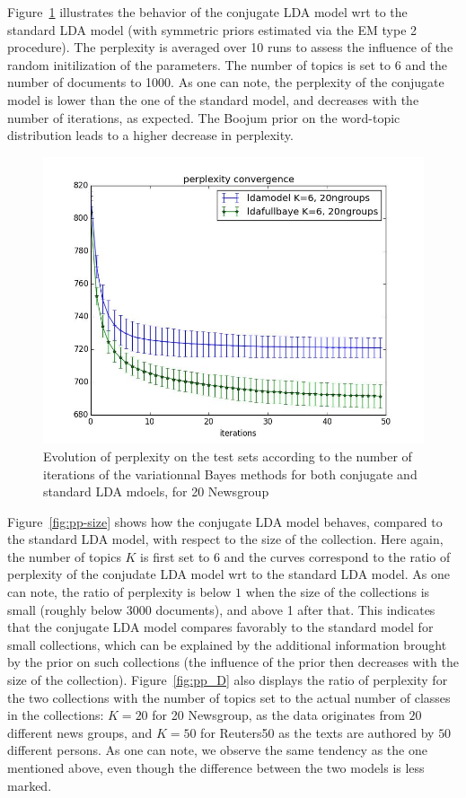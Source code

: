 Figure~\ref{fig:pp-exple} illustrates the behavior of the conjugate LDA model wrt to the standard LDA model (with symmetric priors estimated via the EM type 2 procedure). The perplexity is averaged over 10 runs to assess the influence of the random initilization of the parameters. The number of topics is set to 6 and the number of documents to 1000. As one can note, the perplexity of the conjugate model is lower than the one of the standard model, and decreases with the number of iterations, as expected. The Boojum prior on the word-topic distribution leads to a higher decrease in perplexity.

\begin{figure}[h]
\label{fig:pp-exple}
\includegraphics[scale=0.4]{results/pp_conv}
\caption{Evolution of perplexity on the test sets according to the number of iterations of the variationnal Bayes methods for both conjugate and standard LDA mdoels, for 20 Newsgroup}
\end{figure}


Figure~\ref{fig:pp-size} shows how the conjugate LDA model behaves, compared to the standard LDA model, with respect to the size of the collection. Here again, the number of topics $K$ is first set to $6$ and the curves correspond to the ratio of perplexity of the conjudate LDA model wrt to the standard LDA model. As one can note, the ratio of perplexity is below $1$ when the size of the collections is small (roughly below 3000 documents), and above 1 after that. This indicates that the conjugate LDA model compares favorably to the standard model for small collections, which can be explained by the additional information brought by the prior on such collections (the influence of the prior then decreases with the size of the collection). Figure~\ref{fig:pp_D} also displays the ratio of perplexity for the two collections with the number of topics set to the actual number of classes in the collections: $K=20$ for 20 Newsgroup, as the data originates from $20$ different news groups, and $K=50$ for Reuters50 as the texts are authored by $50$ different persons. As one can note, we observe the same tendency as the one mentioned above, even though the difference between the two models is less marked.

